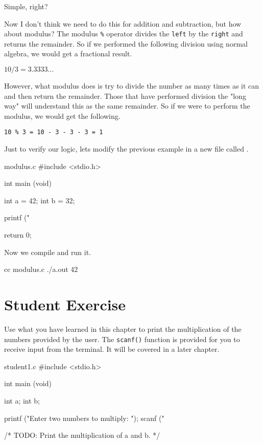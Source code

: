Simple, right?

Now I don't think we need to do this for addition and subtraction, but how about
modulus? The modulus \verb|%| operator divides the \verb|left| by the
\verb|right| and returns the remainder. So if we performed the following
division using normal algebra, we would get a fractional result.

\begin{center}
\begin{math}
10 / 3 = 3.3333...
\end{math}
\end{center}

However, what modulus does is try to divide the number as many times as it can
and then return the remainder. Those that have performed division the "long way"
will understand this as the same remainder. So if we were to perform the
modulus, we would get the following.

\begin{center}
\verb|10 % 3 = 10 - 3 - 3 - 3 = 1|
\end{center}

Just to verify our logic, lets modify the previous example in a new file
called .

\begin{code}{modulus.c}
#include <stdio.h>

int
main (void)
{
    int a = 42;
    int b = 32;

    printf ("%

    return 0;
}
\end{code}

Now we compile  and run it.

\begin{Terminal}
cc modulus.c
./a.out
42 %
\end{Terminal}

\section{Student Exercise}

Use what you have learned in this chapter to print the multiplication of
the numbers provided by the user. The \verb|scanf()| function is provided for
you to receive input from the terminal. It will be covered in a later chapter.

\begin{code}{student1.c}
#include <stdio.h>

int
main (void)
{
    int a;
    int b;

    printf ("Enter two numbers to multiply:  ");
    scanf ("%

    /* TODO: Print the multiplication of a and b. */
}
\end{code}

